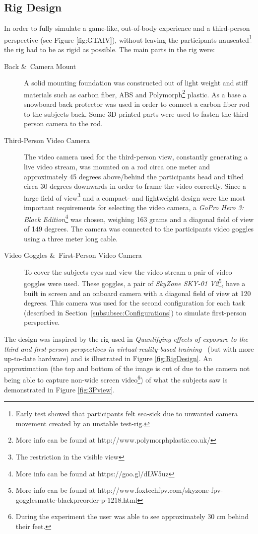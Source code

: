 \documentclass[runningheads,a4paper,oribibl]{llncs}
\begin{document}
\subsection{Rig Design}
In order to fully simulate a game-like, out-of-body experience and a third-person perspective (see Figure \ref{fig:GTAIV}), without leaving the participants nauseated\footnote{Early test showed that participants felt sea-sick due to unwanted camera movement created by an unstable test-rig.} the rig had to be as rigid as possible. The main parts in the rig were:
\begin{description}
   \item[Back \&\ Camera Mount] A solid mounting foundation was constructed out of light weight and stiff materials such as carbon fiber, ABS and Polymorph\footnote{More info can be found at http://www.polymorphplastic.co.uk/} plastic. As a base a snowboard back protector was used in order to connect a carbon fiber rod to the subjects back. Some 3D-printed parts were used to fasten the third-person camera to the rod.

   \item[Third-Person Video Camera] The video camera used for the third-person view, constantly generating a live video stream, was mounted on a rod circa one meter and approximately 45 degrees above/behind the participants head and tilted circa 30 degrees downwards in order to frame the video correctly. Since a large field of view\footnote{The restriction in the visible view} and a compact- and lightweight design were the most important requirements for selecting the video camera, a \emph{GoPro Hero 3: Black Edition}\footnote{More info can be found at https://goo.gl/dLW5uz} was chosen, weighing 163 grams and a diagonal field of view of 149 degrees. The camera was connected to the participants video goggles using a three meter long cable.
   \item[Video Goggles \&\ First-Person Video Camera] To cover the subjects eyes and view the video stream a pair of video goggles were used. These goggles, a pair of \emph{SkyZone SKY-01 V2}\footnote{More info can be found at http://www.foxtechfpv.com/skyzone-fpv-gogglesmatte-blackpreorder-p-1218.html}, have a built in screen and an onboard camera with a diagonal field of view at 120 degrees. This camera was used for the second configuration for each task (described in Section~\ref{subsubsec:Configurations}) to simulate first-person perspective.
\end{description}
The design was inspired by the rig used in \emph{Quantifying effects of exposure to the third and first-person perspectives in virtual-reality-based training}~\cite{salamin2010quantifying} (but with more up-to-date hardware) and is illustrated in Figure \ref{fig:RigDesign}. An approximation (the top and bottom of the image is cut of due to the camera not being able to capture non-wide screen video\footnote{During the experiment the user was able to see approximately 30 cm behind their feet.}) of what the subjects saw is demonstrated in Figure \ref{fig:3Pview}.
\end{document}

